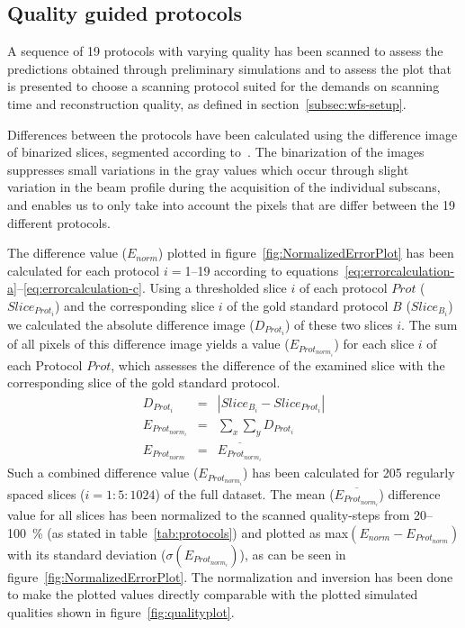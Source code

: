 \subsection{Quality guided protocols}
\cbstart
A sequence of 19 protocols with varying quality has been scanned to assess the predictions obtained through preliminary simulations and to assess the plot that is presented to choose a scanning protocol suited for the demands on scanning time and reconstruction quality, as defined in section~\ref{subsec:wfs-setup}.

Differences between the protocols have been calculated using the difference image of binarized slices, segmented according to~\citet{Otsu1979}. The binarization of the images suppresses small variations in the gray values which occur through slight variation in the beam profile during the acquisition of the individual subscans, and enables us to only take into account the pixels that are differ between the 19 different protocols.

The difference value ($E_{norm}$) plotted in figure~\ref{fig:NormalizedErrorPlot} has been calculated for each protocol $i=$1--19 according to equations~\ref{eq:errorcalculation-a}--\ref{eq:errorcalculation-c}. Using a thresholded slice $i$ of each protocol $Prot$ ($Slice_{Prot_{i}}$) and the corresponding slice $i$ of the gold standard protocol $B$ ($Slice_{B_{i}}$) we calculated the absolute difference image ($D_{Prot_{i}}$) of these two slices $i$. The sum of all pixels of this difference image yields a value ($E_{Prot_{norm_{i}}}$) for each slice $i$ of each Protocol $Prot$, which assesses the difference of the examined slice with the corresponding slice of the gold standard protocol. 
\begin{eqnarray}
       D_{Prot_{i}} &=& |Slice_{B_{i}}-Slice_{Prot_{i}}|\label{eq:errorcalculation-a}\\
E_{Prot_{norm_{i}}} &=& \sum_{x}\sum_{y} D_{Prot_{i}}\label{eq:errorcalculation-b}\\
    E_{Prot_{norm}} &=& \overline{E_{Prot_{norm_{i}}}}\label{eq:errorcalculation-c}
\end{eqnarray}
Such a combined difference value ($E_{Prot_{norm_{i}}}$) has been calculated for 205 regularly spaced slices ($i=1:5:1024$) of the full dataset. The mean ($\overline{E_{Prot_{norm_{i}}}}$) difference value for all slices has been normalized to the scanned quality-steps from 20--\SI{100}{\percent} (as stated in table~\ref{tab:protocols}) and plotted as max$(E_{norm}-E_{Prot_{norm}})$ with its standard deviation ($\sigma(E_{Prot_{norm_{i}}})$), as can be seen in figure~\ref{fig:NormalizedErrorPlot}. The normalization and inversion has been done to make the plotted values directly comparable with the plotted simulated qualities shown in figure~\ref{fig:qualityplot}.
\cbend

